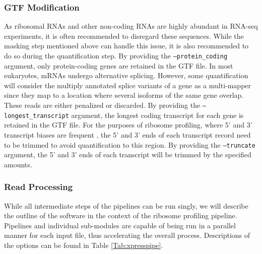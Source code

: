 \documentclass[11pt, a4paper, oneside]{article}
\begin{document}
\subsubsection{GTF Modification}
As ribosomal RNAs and other non-coding RNAs are highly abundant in RNA-seq experiments, it is often recommended to disregard these sequences. While the masking step mentioned above can handle this issue, it is also recommended to do so during the quantification step. By providing the \texttt{--protein\_coding} argument, only protein-coding genes are retained in the GTF file.
In most eukaryotes, mRNAs undergo alternative splicing. However, some quantification will consider the multiply annotated splice variants of a gene as a multi-mapper since they map to a location where several isoforms of the same gene overlap. These reads are either penalized or discarded. By providing the \texttt{--longest\_transcript} argument, the longest coding transcript for each gene is retained in the GTF file.
For the purposes of ribosome profiling, where 5' and 3' transcript biases are frequent \cite{ingolia_meth, weinberg_reports}, the 5' and 3' ends of each transcript record need to be trimmed to avoid quantification to this region. By providing the \texttt{--truncate} argument, the 5' and 3' ends of each transcript will be trimmed by the specified amounts.

\subsubsection{Read Processing}
While all intermediate steps of the pipelines can be run singly, we will describe the outline of the software in the context of the ribosome profiling pipeline. Pipelines and individual sub-modules are capable of being run in a parallel manner for each input file, thus accelerating the overall process. Descriptions of the options can be found in Table \ref{Tab:xpresspipe}.
\end{document}
